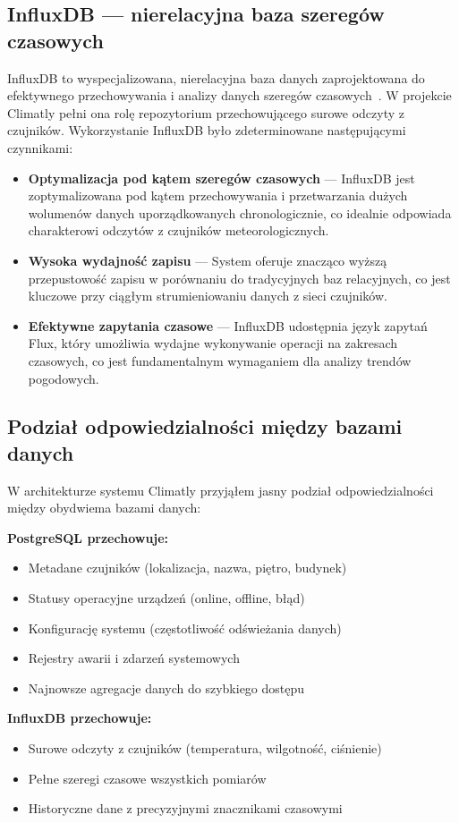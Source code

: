 \documentclass[a4paper,12pt,openany]{book}
\begin{document}
\subsection*{InfluxDB --- nierelacyjna baza szeregów czasowych}
InfluxDB to wyspecjalizowana, nierelacyjna baza danych zaprojektowana do efektywnego przechowywania i analizy danych szeregów czasowych~\cite{bib:influxdb2023}. W projekcie Climatly pełni ona rolę repozytorium przechowującego surowe odczyty z czujników. Wykorzystanie InfluxDB było zdeterminowane następującymi czynnikami:

\begin{itemize}
  \item \textbf{Optymalizacja pod kątem szeregów czasowych} --- InfluxDB jest zoptymalizowana pod kątem przechowywania i przetwarzania dużych wolumenów danych uporządkowanych chronologicznie, co idealnie odpowiada charakterowi odczytów z czujników meteorologicznych.
  \item \textbf{Wysoka wydajność zapisu} --- System oferuje znacząco wyższą przepustowość zapisu w porównaniu do tradycyjnych baz relacyjnych, co jest kluczowe przy ciągłym strumieniowaniu danych z sieci czujników.
  \item \textbf{Efektywne zapytania czasowe} --- InfluxDB udostępnia język zapytań Flux, który umożliwia wydajne wykonywanie operacji na zakresach czasowych, co jest fundamentalnym wymaganiem dla analizy trendów pogodowych.
\end{itemize}

\subsection*{Podział odpowiedzialności między bazami danych}
W architekturze systemu Climatly przyjąłem jasny podział odpowiedzialności między obydwiema bazami danych:

\textbf{PostgreSQL przechowuje:}
\begin{itemize}[noitemsep,topsep=0pt]
\item Metadane czujników (lokalizacja, nazwa, piętro, budynek)
\item Statusy operacyjne urządzeń (online, offline, błąd)
\item Konfigurację systemu (częstotliwość odświeżania danych)
\item Rejestry awarii i zdarzeń systemowych
\item Najnowsze agregacje danych do szybkiego dostępu
\end{itemize}
\vspace{10pt}
\textbf{InfluxDB przechowuje:}
\begin{itemize}[noitemsep,topsep=0pt]
\item Surowe odczyty z czujników (temperatura, wilgotność, ciśnienie)
\item Pełne szeregi czasowe wszystkich pomiarów
\item Historyczne dane z precyzyjnymi znacznikami czasowymi
\end{itemize}
\end{document}
